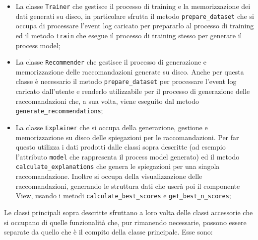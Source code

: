 \begin{itemize}
\item La classe \texttt{Trainer} che gestisce il processo di training e la memorizzazione dei dati generati su disco, in particolare sfrutta il metodo \texttt{prepare\_dataset} che si occupa di processare l'event log caricato per prepararlo al processo di training ed il metodo \texttt{train} che esegue il processo di training stesso per generare il process model;


\item La classe \texttt{Recommender} che gestisce il processo di generazione e memorizzazione delle raccomandazioni generate su disco. Anche per questa classe è necessario il metodo \texttt{prepare\_dataset} per processare l'event log caricato dall'utente e renderlo utilizzabile per il processo di generazione delle raccomandazioni che, a sua volta, viene eseguito dal metodo \texttt{generate\_recommendations};

\item La classe \texttt{Explainer} che si occupa della generazione, gestione e memorizzazione su disco delle spiegazioni per le raccomandazioni. Per far questo utilizza i dati prodotti dalle classi sopra descritte (ad esempio l'attributo \texttt{model} che rappresenta il process model generato) ed il metodo \texttt{calculate\_explanations} che genera le spiegazioni per una singola raccomandazione. Inoltre si occupa della visualizzazione delle raccomandazioni, generando le struttura dati che userà poi il componente View, usando i metodi \texttt{calculate\_best\_scores} e \texttt{get\_best\_n\_scores};

\end{itemize}

Le classi principali sopra descritte sfruttano a loro volta delle classi accessorie che si occupano di quelle funzionalità che, pur rimanendo necessarie, possono essere separate da quello che è il compito della classe principale. Esse sono:

